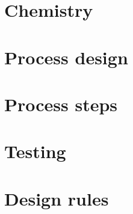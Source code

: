 \documentclass[10pt,a4paper,oneside]{article}
\newcounter{ct}
\begin{document}
\section{Chemistry}


\newpage
\section{Process design}

\newpage




\newpage

\newpage

\newpage

\newpage

\newpage

\newpage

\newpage
\section{Process steps}
\label{process_overview}
\newpage

\newpage

\newpage

\newpage

\newpage

\newpage

\newpage

\newpage

\newpage

\newpage

\newpage

\newpage
\section{Testing}

\newpage

\newpage

\newpage
\section{Design rules}



\newpage
\listoffootnotes \cleardoublepage
\end{document}
